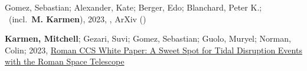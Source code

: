 \item[{\color{numcolor}\scriptsize2}] Gomez, Sebastian; Alexander, Kate; Berger, Edo; Blanchard, Peter K.; \etal\ (incl.\ \textbf{M. Karmen}), 2023, , ArXiv ()

\item[{\color{numcolor}\scriptsize1}] \textbf{Karmen, Mitchell}; Gezari, Suvi; Gomez, Sebastian; Guolo, Muryel; Norman, Colin; 2023, \href{https://asd.gsfc.nasa.gov/roman/wps_2023/files/026_Karmen_HLTDS.pdf}{Roman CCS White Paper: A Sweet Spot for Tidal Disruption Events with the
Roman Space Telescope}